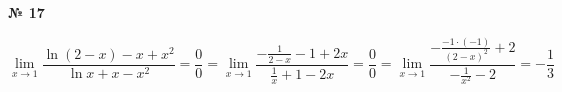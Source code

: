 \documentclass{article}
\begin{document}
\textbf{№ 17} 
\Large

$$ \lim\limits_{x\to 1} \frac{\ln{(2-x)}-x+x^2}{\ln{x}+x-x^2}
= \frac{0}{0}
= \lim\limits_{x\to 1} \frac{-\frac{1}{2-x}-1+2x}{\frac{1}{x}+1-2x}
= \frac{0}{0} 
= \lim\limits_{x\to 1} \frac{-\frac{-1\cdot(-1)}{(2-x)^2}+2}{-\frac{1}{x^2}-2}
= -\frac{1}{3}$$
\end{document}
